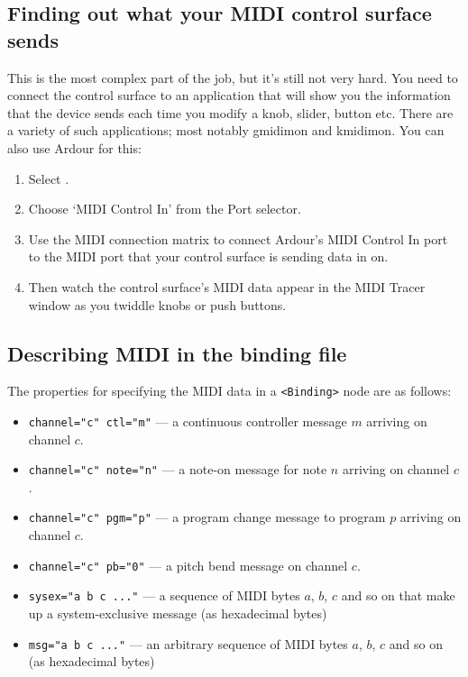 \documentclass[10pt,a4paper]{book}
\newcommand{\menu}[1]{\emph{\StrSubstitute{#1}{,}{ $\rightarrow$ }}}
\begin{document}
{\subsection{Finding out what your MIDI control surface sends}

This is the most complex part of the job, but it's still not very hard.
You need to connect the control surface to an application that will
show you the information that the device sends each time you modify a
knob, slider, button etc.  There are a variety of such applications;
most notably gmidimon and kmidimon.  You can also use Ardour for this:

\begin{enumerate}
\item Select \menu{Window,MIDI Tracer}.
\item Choose `MIDI Control In' from the Port selector.
\item Use the MIDI connection matrix to connect Ardour's
MIDI Control In port to the MIDI port that your control surface is
sending data in on.
\item Then watch the control surface's MIDI data appear
in the MIDI Tracer window as you twiddle knobs or push buttons.
\end{enumerate}


\subsection{Describing MIDI in the binding file}

The properties for specifying the MIDI data in a \texttt{<Binding>}
node are as follows:

\begin{itemize}
\item \texttt{channel="c" ctl="m"} --- a continuous controller message $m$ arriving on channel $c$.
\item \texttt{channel="c" note="n"} --- a note-on message for note $n$ arriving on channel $c$.
\item \texttt{channel="c" pgm="p"} --- a program change message to program $p$ arriving on channel $c$.
\item \texttt{channel="c" pb="0"} --- a pitch bend message on channel $c$.
\item \texttt{sysex="a b c ..."} --- a sequence of MIDI bytes $a$, $b$, $c$ and so on that make up a system-exclusive message (as hexadecimal bytes)
\item \texttt{msg="a b c ..."} --- an arbitrary sequence of MIDI bytes $a$, $b$, $c$ and so on (as hexadecimal bytes)
\end{itemize}

}
\end{document}
